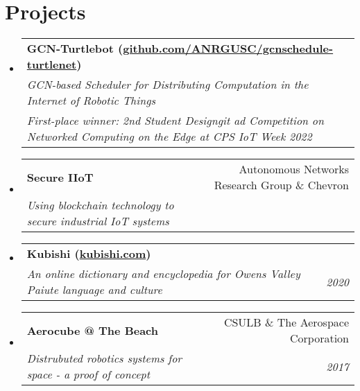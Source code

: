 \documentclass[letterpaper,11pt]{article}
\makeatletter
\newcommand{\resumeSubheading}[4]{
  \vspace{-1pt}\item[]
    \begin{tabular*}{0.97\textwidth}{l@{\extracolsep{\fill}}r}
      \textbf{#1} & #2 \\
      \textit{\small#3} & \textit{\small #4} \\
    \end{tabular*}\vspace{-5pt}
}
\newcommand{\resumeSubheadingTwo}[6]{
  \vspace{-1pt}\item[]
    \begin{tabular*}{0.97\textwidth}{l@{\extracolsep{\fill}}r}
      \textbf{#1} & #2 \\
      \textit{\small#3} & \textit{\small #4} \\
      \textit{\small#5} & \textit{\small #6}
    \end{tabular*}\vspace{-5pt}
}
\newcommand{\resumeSubHeadingListStart}{\begin{itemize}[leftmargin=*]}
\newcommand{\resumeSubHeadingListEnd}{\end{itemize}}
\makeatother
\begin{document}
\section{Projects}
\resumeSubHeadingListStart
    \resumeSubheadingTwo
    {GCN-Turtlebot (\href{https://github.com/ANRGUSC/gcnschedule-turtlenet}{github.com/ANRGUSC/gcnschedule-turtlenet})}{}
    {GCN-based Scheduler for Distributing Computation in the Internet of Robotic Things}{}
    {First-place winner: 2nd Student Designgit ad Competition on Networked Computing on the Edge at CPS IoT Week 2022}{}

    \resumeSubheading
    {Secure IIoT}{Autonomous Networks Research Group \& Chevron}
    {Using blockchain technology to secure industrial IoT systems}{}

    \resumeSubheading
    {Kubishi (\href{https://kubishi.com}{kubishi.com})}{}
    {An online dictionary and encyclopedia for Owens Valley Paiute language and culture}{2020}
    
    \resumeSubheading
    {Aerocube @ The Beach}{CSULB \& The Aerospace Corporation}
    {Distrubuted robotics systems for space - a proof of concept}{2017}
\resumeSubHeadingListEnd

\end{document}

